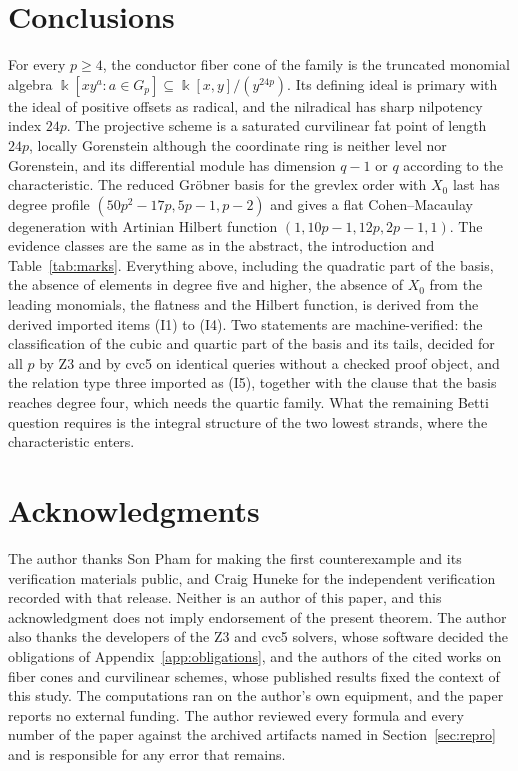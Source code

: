 \documentclass[11pt]{article}
\theoremstyle{definition}
\theoremstyle{remark}
\newcommand{\kfield}{\Bbbk}
\begin{document}
\section{Conclusions}\label{sec:conclusions}

For every $p\geq4$, the conductor fiber cone of the family is the truncated monomial algebra
$\kfield[xy^a:a\in G_p]\subseteq\kfield[x,y]/(y^{24p})$. Its defining ideal is primary with the
ideal of positive offsets as radical, and the nilradical has sharp nilpotency index $24p$. The
projective scheme is a saturated curvilinear fat point of length $24p$, locally Gorenstein
although the coordinate ring is neither level nor Gorenstein, and its differential module has
dimension $q-1$ or $q$ according to the characteristic. The reduced Gr\"obner basis for the
grevlex order with $X_0$ last has degree profile $(50p^2-17p,5p-1,p-2)$ and gives a flat
Cohen--Macaulay degeneration with Artinian Hilbert function $(1,10p-1,12p,2p-1,1)$. The evidence
classes are the same as in the abstract, the introduction and Table~\ref{tab:marks}. Everything
above, including the quadratic part of the basis, the absence of elements in degree five and
higher, the absence of $X_0$ from the leading monomials, the flatness and the Hilbert function, is
derived from the derived imported items (I1) to (I4). Two statements are machine-verified: the
classification of the cubic and quartic part of the basis and its tails, decided for all $p$ by
Z3 and by cvc5 on identical queries without a checked proof object, and the relation type three
imported as (I5), together with the clause that the basis reaches degree four, which needs the
quartic family. What the remaining Betti question requires is the integral structure of the two
lowest strands, where the characteristic enters.

\section*{Acknowledgments}

The author thanks Son Pham for making the first counterexample and its verification materials
public, and Craig Huneke for the independent verification recorded with that release. Neither is
an author of this paper, and this acknowledgment does not imply endorsement of the present
theorem. The author also thanks the developers of the Z3 and cvc5 solvers, whose software decided
the obligations of Appendix~\ref{app:obligations}, and the authors of the cited works on fiber cones
and curvilinear schemes, whose published results fixed the context of this study. The computations
ran on the author's own equipment, and the paper reports no external funding. The author
reviewed every formula and every number of the paper against the archived artifacts named in
Section~\ref{sec:repro} and is responsible for any error that remains.
\end{document}
